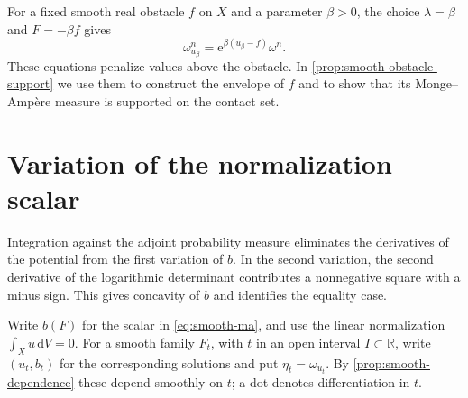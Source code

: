 For a fixed smooth real obstacle $f$ on $X$ and a parameter $\beta>0$, the choice $\lambda=\beta$ and $F=-\beta f$ gives
\[
 \omega_{u_\beta}^n=\mathrm{e}^{\beta(u_\beta-f)}\omega^n.
\]
These equations penalize values above the obstacle. In \cref{prop:smooth-obstacle-support} we use them to construct the envelope of $f$ and to show that its Monge--Amp\`ere measure is supported on the contact set.

\section{Variation of the normalization scalar}

Integration against the adjoint probability measure eliminates the derivatives of the potential from the first variation of $b$. In the second variation, the second derivative of the logarithmic determinant contributes a nonnegative square with a minus sign. This gives concavity of $b$ and identifies the equality case.

Write $b(F)$ for the scalar in \eqref{eq:smooth-ma}, and use the linear normalization $\int_Xu\,\mathrm{d}V=0$. For a smooth family $F_t$, with $t$ in an open interval $I\subset\mathbb R$, write $(u_t,b_t)$ for the corresponding solutions and put $\eta_t=\omega_{u_t}$. By \cref{prop:smooth-dependence} these depend smoothly on $t$; a dot denotes differentiation in $t$.

